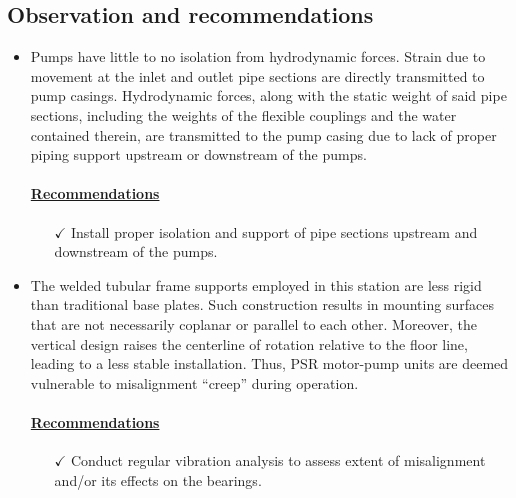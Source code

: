 \subsection{Observation and recommendations}
\begin{itemize}
\item Pumps have little to no isolation from hydrodynamic forces. Strain due to movement at the inlet and outlet pipe sections are directly transmitted to pump casings. Hydrodynamic forces, along with the static weight of said pipe sections, including the weights of the flexible couplings and the water contained therein, are transmitted to the pump casing due to lack of proper piping support upstream or downstream of the pumps.


\paragraph{\underline{Recommendations}}
\begin{itemize}
	\item [$\checkmark$] Install proper isolation and support of pipe sections upstream and downstream of the pumps. 
\end{itemize}

\item The welded tubular frame supports employed in this station are less rigid than traditional base plates. Such construction results in mounting surfaces that are not necessarily coplanar or parallel to each other. Moreover, the vertical design raises the centerline of rotation relative to the floor line, leading to a less stable installation. Thus, PSR motor-pump units are deemed vulnerable to misalignment “creep” during operation.

\paragraph{\underline{Recommendations}}
\begin{itemize}
	\item [$\checkmark$] Conduct regular vibration analysis to assess extent of misalignment and/or its effects on the bearings. 
\end{itemize}

\end{itemize}




